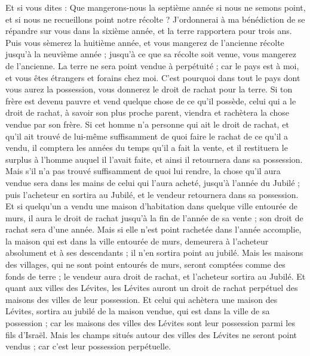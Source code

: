 \begin{multicols}{2}
Et si vous dites : Que mangerons-nous la septième année si nous ne semons point, et si nous ne recueillons point notre récolte ?
J’ordonnerai à ma bénédiction de se répandre sur vous dans la sixième année, et la terre rapportera pour trois ans.
Puis vous sèmerez la huitième année, et vous mangerez de l’ancienne récolte jusqu'à la neuvième année ; jusqu'à ce que sa récolte soit venue, vous mangerez de l’ancienne.
La terre ne sera point vendue à perpétuité ; car le pays est à moi, et vous êtes étrangers et forains chez moi.
C'est pourquoi dans tout le pays dont vous aurez la possession, vous donnerez le droit de rachat pour la terre.
Si ton frère est devenu pauvre et vend quelque chose de ce qu'il possède, celui qui a le droit de rachat, à savoir son plus proche parent, viendra et rachètera la chose vendue par son frère.
Si cet homme n'a personne qui ait le droit de rachat, et qu'il ait trouvé de lui-même suffisamment de quoi faire le rachat de ce qu'il a vendu,
il comptera les années du temps qu'il a fait la vente, et il restituera le surplus à l'homme auquel il l'avait faite, et ainsi il retournera dans sa possession.
Mais s'il n'a pas trouvé suffisamment de quoi lui rendre, la chose qu'il aura vendue sera dans les mains de celui qui l'aura acheté, jusqu'à l'année du Jubilé ; puis l'acheteur en sortira au Jubilé, et le vendeur retournera dans sa possession.
Et si quelqu'un a vendu une maison d’habitation dans quelque ville entourée de murs, il aura le droit de rachat jusqu'à la fin de l'année de sa vente ; son droit de rachat sera d'une année.
Mais si elle n'est point rachetée dans l'année accomplie, la maison qui est dans la ville entourée de murs, demeurera à l'acheteur absolument et à ses descendants ; il n'en sortira point au jubilé.
Mais les maisons des villages, qui ne sont point entourés de murs, seront comptées comme des fonds de terre ; le vendeur aura droit de rachat, et l'acheteur sortira au Jubilé.
Et quant aux villes des Lévites, les Lévites auront un droit de rachat perpétuel des maisons des villes de leur possession.
Et celui qui achètera une maison des Lévites, sortira au jubilé de la maison vendue, qui est dans la ville de sa possession ; car les maisons des villes des Lévites sont leur possession parmi les fils d'Israël.
Mais les champs situés autour des villes des Lévites ne seront point vendus ; car c'est leur possession perpétuelle.

\end{multicols}
